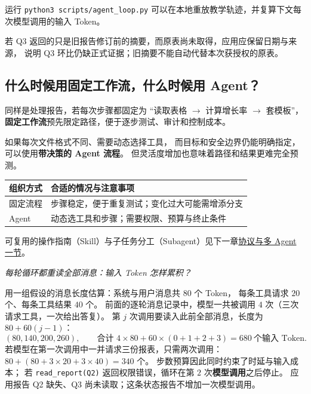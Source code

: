 \par\smallskip{}\enspace
运行 \texttt{python3 scripts/agent\_loop.py} 可以在本地重放教学轨迹，并复算下文每次模型调用的输入 Token。

若 Q3 返回的只是旧报告修订前的摘要，而原表尚未取得，应用应保留日期与来源，
说明 Q3 环比仍缺正式证据；旧摘要不能自动代替本次获授权的原表。

\subsection{什么时候用固定工作流，什么时候用 Agent？}
\label{concept:workflow}

同样是处理报告，若每次步骤都固定为
“读取表格 $\to$ 计算增长率 $\to$ 套模板”，
\textbf{固定工作流}预先限定路径，便于逐步测试、审计和控制成本。

如果每次文件格式不同、需要动态选择工具，
而目标和安全边界仍能明确指定，
可以使用\textbf{带决策的 Agent 流程}。
但灵活度增加也意味着路径和结果更难完全预测。

\begin{center}
\small
\renewcommand{\arraystretch}{1.3}
\begin{tabularx}{\linewidth}{@{}p{26mm}X@{}}
\toprule
组织方式 & 合适的情况与注意事项\\
\midrule
固定流程 & 步骤稳定，便于重复测试；变化过大可能需增添分支\\
Agent & 动态选工具和步骤；需要权限、预算与终止条件\\
\bottomrule
\end{tabularx}
\end{center}
可复用的操作指南（Skill）与子任务分工（Subagent）见下一章\hyperref[concept:skill]{协议与多 Agent 一节}。


\begin{example}[breakable=false]
\noindent\emph{每轮循环都重读全部消息：输入 Token 怎样累积？}\par
用一组假设的消息长度估算：系统与用户消息共 $80$ 个 Token，
每条工具请求 $20$ 个、每条工具结果 $40$ 个。
前面的逐轮消息记录中，模型一共被调用 $4$ 次（三次请求工具，一次给出答复）。
第 $j$ 次调用要读入此前全部消息，长度为 $80+60(j-1)$：
\[
(80,140,200,260),\qquad
\text{合计 } 4\times80+60\times(0+1+2+3)=\boxed{680}\ \text{个输入 Token}.
\]
若模型在第一次调用中一并请求三份报表，只需两次调用：$80+(80+3\times20+3\times40)=340$ 个。
步数预算因此同时约束了时延与输入成本；
若 \texttt{read\_report(Q2)} 返回权限错误，循环在第 $2$ 次\textbf{模型调用}之后停止。
应用报告 Q2 缺失、Q3 尚未读取；这条状态报告不增加一次模型调用。
\end{example}
